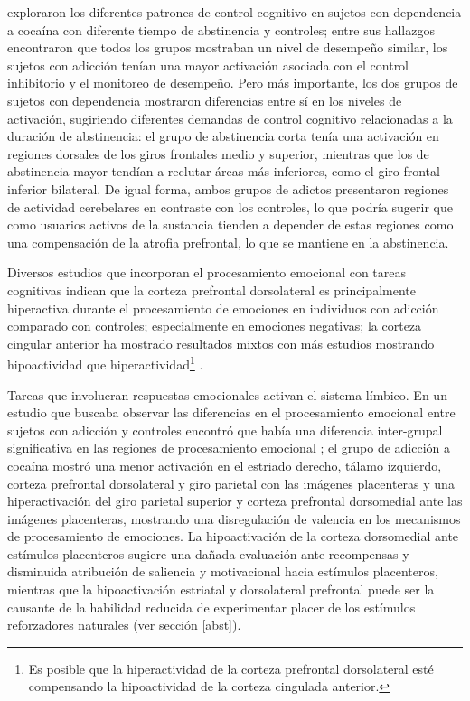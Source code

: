 \textcite{Connolly2012} exploraron los diferentes patrones de control cognitivo en sujetos con dependencia a cocaína con diferente tiempo de abstinencia y controles;
entre sus hallazgos encontraron que todos los grupos mostraban un nivel de desempeño similar, los sujetos con adicción tenían una mayor activación asociada con el control inhibitorio y el monitoreo de desempeño. Pero más importante, los dos grupos de sujetos con dependencia mostraron diferencias entre sí en los niveles de activación, sugiriendo diferentes demandas de control cognitivo relacionadas a la duración de abstinencia: el grupo de abstinencia corta tenía una activación en regiones dorsales de los giros frontales medio y superior, mientras que los de abstinencia mayor tendían a reclutar áreas más inferiores, como el giro frontal inferior bilateral.
De igual forma, ambos grupos de adictos presentaron regiones de actividad cerebelares en contraste con los controles, lo que podría sugerir que como usuarios activos de la sustancia tienden a depender de estas regiones como una compensación de la atrofia prefrontal, lo que se mantiene en la abstinencia. \par
Diversos estudios que incorporan el procesamiento emocional con tareas cognitivas indican que la corteza prefrontal dorsolateral es principalmente hiperactiva durante el procesamiento de emociones en individuos con adicción comparado con controles; especialmente en emociones negativas; la corteza cingular anterior ha mostrado resultados mixtos \textemdash{}con más estudios mostrando hipoactividad que hiperactividad\footnote{Es posible que la hiperactividad de la corteza prefrontal dorsolateral esté compensando la hipoactividad de la corteza cingulada anterior.} \parencite{Goldstein2012a}.\par
Tareas que involucran respuestas emocionales activan el sistema límbico. En un estudio que buscaba observar las diferencias en el procesamiento emocional entre sujetos con adicción y controles encontró que había una diferencia inter-grupal significativa en las regiones de procesamiento emocional \parencite{Asensio2010}; el grupo de adicción a cocaína mostró una menor activación en el estriado derecho, tálamo izquierdo, corteza prefrontal dorsolateral y giro parietal con las imágenes placenteras y una hiperactivación del giro parietal superior y corteza prefrontal dorsomedial ante las imágenes placenteras, mostrando una disregulación de valencia en los mecanismos de procesamiento de emociones.
La hipoactivación de la corteza dorsomedial ante estímulos placenteros sugiere una dañada evaluación ante recompensas y disminuida atribución de saliencia y motivacional hacia estímulos placenteros, mientras que la hipoactivación estriatal y dorsolateral prefrontal puede ser la causante de la habilidad reducida de experimentar placer de los estímulos reforzadores naturales (ver sección \ref{abst}).

